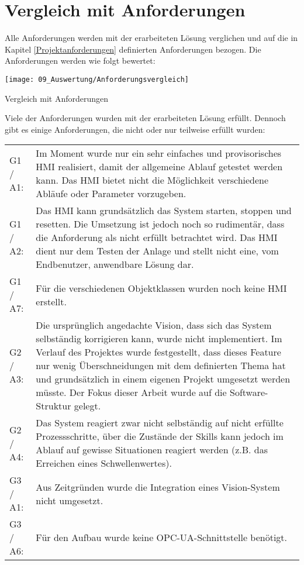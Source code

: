 \section{Vergleich mit Anforderungen} \label{Anforderungsvergleich}

	Alle Anforderungen werden mit der erarbeiteten Lösung verglichen und auf die in Kapitel \ref{Projektanforderungen} definierten Anforderungen bezogen.  Die Anforderungen werden wie folgt bewertet:
	\begin{table}[H]
		\centering
		\texttt{[image: 09\_Auswertung/Anforderungsvergleich]}
		\captionsetup{justification=centering}
		\caption{Vergleich mit Anforderungen}
		\label{tab:Anforderungsvergleich}
	\end{table}
	
	Viele der Anforderungen wurden mit der erarbeiteten Lösung erfüllt. Dennoch gibt es einige
	Anforderungen, die nicht oder nur teilweise erfüllt wurden:
	
	\begin{tabularx}{\textwidth}{@{}>{}p{4em} X@{}}
		G1 / A1: & 
		Im Moment wurde nur ein sehr einfaches und provisorisches HMI realisiert, damit der allgemeine Ablauf getestet werden kann. Das HMI bietet nicht die Möglichkeit verschiedene Abläufe oder Parameter vorzugeben.
		\\
		G1 / A2: & 
		Das HMI kann grundsätzlich das System starten, stoppen und resetten. Die Umsetzung ist jedoch noch so rudimentär, dass die Anforderung als nicht erfüllt betrachtet wird. Das HMI dient nur dem Testen der Anlage und stellt nicht eine, vom Endbenutzer, anwendbare Lösung dar. 
		\\
		G1 / A7: & 
		Für die verschiedenen Objektklassen wurden noch keine HMI erstellt. 
		\\
		G2 / A3: & 
		Die ursprünglich angedachte Vision, dass sich das System selbständig korrigieren kann, wurde nicht implementiert. Im Verlauf des Projektes wurde festgestellt, dass dieses Feature nur wenig Überschneidungen mit dem definierten Thema hat und grundsätzlich in einem eigenen Projekt umgesetzt werden müsste. Der Fokus dieser Arbeit wurde auf die Software-Struktur gelegt. 
		\\
		G2 / A4: & 
		Das System reagiert zwar nicht selbständig auf nicht erfüllte Prozessschritte, über die Zustände der Skills kann jedoch im Ablauf auf gewisse Situationen reagiert werden (z.B. das Erreichen eines Schwellenwertes).
		\\
		G3 / A1: & 
		Aus Zeitgründen wurde die Integration eines Vision-System nicht umgesetzt.
		\\
		G3 / A6: & 
		Für den Aufbau wurde keine OPC-UA-Schnittstelle benötigt. 
		\\
	\end{tabularx}
	
	
	\newpage
